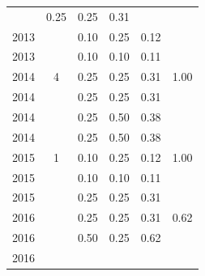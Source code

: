 \begin{table}[H]
\begin{tabular}{| l | c | c | c | c | c |}
          &
          0.25
          &
          0.25
          &
          0.31
          &
          \\
            2013
          &
          
          &
          0.10
          &
          0.25
          &
          0.12
          &
          \\
            2013
          &
          
          &
          0.10
          &
          0.10
          &
          0.11
          &
          \\
\hline
            2014
          &
          4
          &
          0.25
          &
          0.25
          &
          0.31
          &
            {\color{blue} 1.00}
          \\
            2014
          &
          
          &
          0.25
          &
          0.25
          &
          0.31
          &
          \\
            2014
          &
          
          &
          0.25
          &
          0.50
          &
          0.38
          &
          \\
            2014
          &
          
          &
          0.25
          &
          0.50
          &
          0.38
          &
          \\
\hline
            2015
          &
          1
          &
          0.10
          &
          0.25
          &
          0.12
          &
            {\color{blue} 1.00}
          \\
            2015
          &
          
          &
          0.10
          &
          0.10
          &
          0.11
          &
          \\
            2015
          &
          
          &
          0.25
          &
          0.25
          &
          0.31
          &
          \\
\hline
            2016
          &
          
          &
          0.25
          &
          0.25
          &
          0.31
          &
            {\color{blue} 0.62}
          \\
            2016
          &
          
          &
          0.50
          &
          0.25
          &
          0.62
          &
          \\
            2016
          &
          

\end{tabular}
\end{table}
